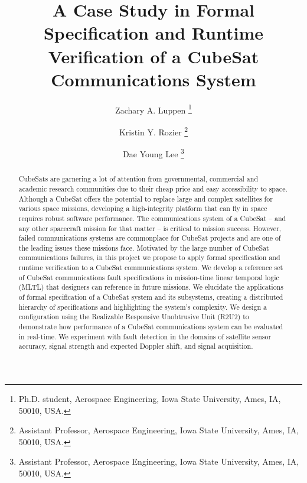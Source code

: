 \documentclass[conf]{new-aiaa}
\title{A Case Study in Formal Specification and Runtime Verification of a CubeSat Communications System}
\author{Zachary A. Luppen \footnote{Ph.D. student, Aerospace Engineering, Iowa State University, Ames, IA, 50010, USA.}}
\author{Kristin Y. Rozier \footnote{Assistant Professor, Aerospace Engineering, Iowa State University, Ames, IA, 50010, USA.}}
\author{Dae Young Lee \footnote{Assistant Professor, Aerospace Engineering, Iowa State University, Ames, IA, 50010, USA.}}
\affil{Iowa State University, Ames, Iowa, 50011, USA.}
\begin{document}
\maketitle

\begin{abstract}

CubeSats are garnering a lot of attention from governmental, commercial and academic research communities due to their cheap price and easy accessibility to space. Although a CubeSat offers the potential to replace large and complex satellites for various space missions, developing a high-integrity platform that can fly in space requires robust software performance. The communications system of a CubeSat -- and any other spacecraft mission for that matter -- is critical to mission success. However, failed communications systems are commonplace for CubeSat projects and are one of the leading issues these missions face.
Motivated by the large number of CubeSat communications failures, in this project we propose to apply formal specification and runtime verification to a %
CubeSat communications system. We develop a reference set of CubeSat communications fault specifications in mission-time linear temporal logic (MLTL) that designers can reference in future missions. We elucidate the applications of formal specification of a CubeSat system and its subsystems, creating a distributed hierarchy of specifications and highlighting the system's complexity. We design a configuration using the Realizable Responsive Unobtrusive Unit (R2U2) to demonstrate how performance of a CubeSat communications system can be evaluated in real-time. We experiment with fault detection in the domains of satellite sensor accuracy, signal strength and expected Doppler shift, and signal acquisition.



\end{abstract}
\end{document}

